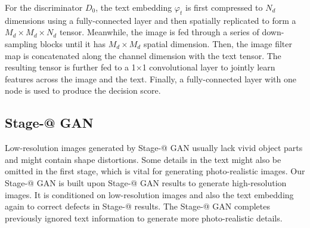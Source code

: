 \documentclass[10pt,twocolumn,letterpaper]{article}
\makeatletter
\newcommand{\Rmnum}[1]{\expandafter\@slowromancap\romannumeral #1@}
\makeatother
\begin{document}
For the discriminator $D_0$, the text embedding $\varphi_{t}$ is first compressed to $N_d$ dimensions using a fully-connected layer and then spatially replicated to form a $M_d \times M_d \times N_d$ tensor. 
Meanwhile, the image is fed through a series of down-sampling blocks until it has $M_d \times M_d$ spatial dimension. 
Then, the image filter map is concatenated along the channel dimension with the text tensor. 
The resulting tensor is further fed to a 1$\times$1 convolutional layer to jointly learn features across the image and the text. 
Finally, a fully-connected layer with one node is used to produce the decision score. 

\subsection{Stage-\Rmnum{2} GAN}
\vspace{-5pt}

Low-resolution images generated by Stage-\Rmnum{1} GAN usually lack vivid object parts and might contain shape distortions. Some details in the text might also be omitted in the first stage, which is vital for generating photo-realistic images.  
Our Stage-\Rmnum{2} GAN is built upon Stage-\Rmnum{1} GAN results to generate high-resolution images. 
It is conditioned on low-resolution images and also the text embedding again to correct defects in Stage-\Rmnum{1} results. The Stage-\Rmnum{2} GAN completes previously ignored text information to generate more photo-realistic details.
\end{document}
